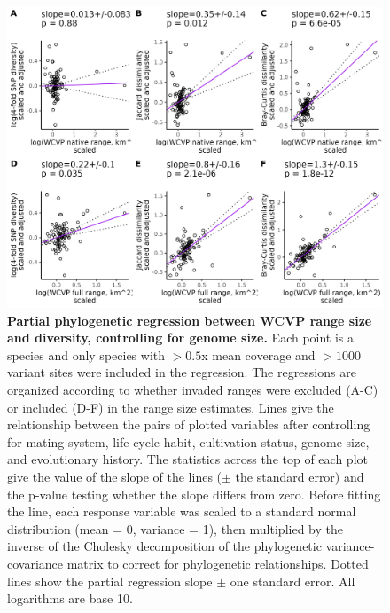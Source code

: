 \documentclass[12pt]{article}
\begin{document}
\begin{figure}[H]
    \centering
    \includegraphics[width=\textwidth]{figures/appendix_d/wcvp_area_vs_diversity_genome-size-corrected_2024-12-12.jpg}
    \caption{\textbf{Partial phylogenetic regression between WCVP range size and diversity, controlling for genome size.} Each point is a species and only species with $>0.5$x mean coverage and $>1000$ variant sites were included in the regression. The regressions are organized according to whether invaded ranges were excluded (A-C) or included (D-F) in the range size estimates. Lines give the relationship between the pairs of plotted variables after controlling for mating system, life cycle habit, cultivation status, genome size, and evolutionary history. The statistics across the top of each plot give the value of the slope of the lines ($\pm$ the standard error) and the p-value testing whether the slope differs from zero. Before fitting the line, each response variable was scaled to a standard normal distribution (mean = 0, variance = 1), then multiplied by the inverse of the Cholesky decomposition of the phylogenetic variance-covariance matrix to correct for phylogenetic relationships. Dotted lines show the partial regression slope $\pm$ one standard error. All logarithms are base 10.}
\end{figure}
\end{document}

